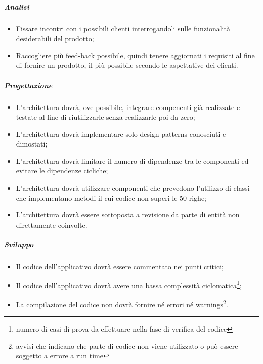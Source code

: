\subparagraph{Analisi}
\begin{itemize}
\item Fissare incontri con i possibili clienti interrogandoli sulle funzionalit\`{a} desiderabili del prodotto;
\item Raccogliere pi\`{u} feed-back possibile, quindi tenere aggiornati i requisiti al fine di fornire un prodotto, il pi\`{u} possibile secondo le aspettative dei clienti.
\end{itemize}
\subparagraph{Progettazione}
\begin{itemize}
\item L\textquoteright{}architettura dovr\`{a}, ove possibile, integrare compenenti gi\`{a} realizzate e testate al fine di riutilizzarle senza realizzarle poi da zero;
\item L\textquoteright{}architettura dovr\`{a} implementare solo design patterns conosciuti e dimostati;
\item L\textquoteright{}architettura dovr\`{a} limitare il numero di dipendenze tra le componenti ed evitare le dipendenze cicliche;
\item L\textquoteright{}architettura dovr\`{a} utilizzare componenti che prevedono l\textquoteright{}utilizzo di classi che implementano metodi il cui codice non superi le 50 righe;
\item L\textquoteright{}architettura dovr\`{a} essere sottoposta a revisione da parte di entit\`{a} non direttamente coinvolte.
\end{itemize}
\subparagraph{Sviluppo}
\begin{itemize}
\item Il codice dell\textquoteright{}applicativo dovr\`{a} essere commentato nei punti critici;
\item Il codice dell\textquoteright{}applicativo dovr\`{a} avere una bassa complessit\`{a} ciclomatica\footnote{numero di casi di prova da effettuare nella fase di verifica del codice};
\item La compilazione del codice non dovr\`{a} fornire né errori né warnings\footnote{avvisi che indicano che parte di codice non viene utilizzato o pu\`{o} essere soggetto a errore a run time}.
\end{itemize}